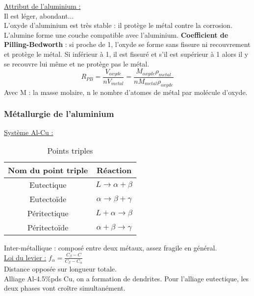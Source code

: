 \documentclass[../main.tex]{subfiles}
\begin{document}
\quad \underline{Attribut de l'aluminium :}\\
Il est léger, abondant...\\
L'oxyde d'aluminium est très stable : il protège le métal contre la corrosion. L'alumine forme une couche compatible avec l'aluminium. \textbf{Coefficient de Pilling-Bedworth} : si proche de 1, l'oxyde se forme sans fissure ni recouvrement et protège le métal. Si inférieur à 1, il est fissuré et s'il est supérieur à 1 alors il y se recouvre lui même et ne protège pas le métal.\\
\begin{equation}
    R_{PB} = \frac{V_{oxyde}}{n V_{metal}} = \frac{M_{oxyde} \rho_{metal}}{n M_{metal} \rho_{oxyde}}
\end{equation}
Avec M : la masse molaire, n le nombre d'atomes de métal par molécule d'oxyde.\\

\subsubsection{Métallurgie de l'aluminium}
\quad \underline{Système Al-Cu :}\\
\begin{table}[hbt!]
    \centering
    \begin{tabular}{c|c}
    \hline
    Nom du point triple & Réaction\\
    \hline
        Eutectique & $L \rightarrow \alpha + \beta$ \\
        Eutectoïde & $\alpha \rightarrow \beta + \gamma$\\
        Péritectique & $L+\alpha \rightarrow \beta$\\
        Péritectoïde & $\alpha + \beta \rightarrow \gamma$\\
    \end{tabular}
    \caption{Points triples}
     
\end{table}

Inter-métallique : composé entre deux métaux, assez fragile en général.\\

\quad \underline{Loi du levier :} $f_{\alpha} = \frac{C_{\beta}-C}{C_{\beta}-C_{\alpha}}$\\
\color{gray} Distance opposée sur longueur totale.\color{black}\\

Alliage Al-4.5$\%$pds Cu, on a formation de dendrites. Pour l'alliage eutectique, les deux phases vont croître simultanément.\\
\end{document}
